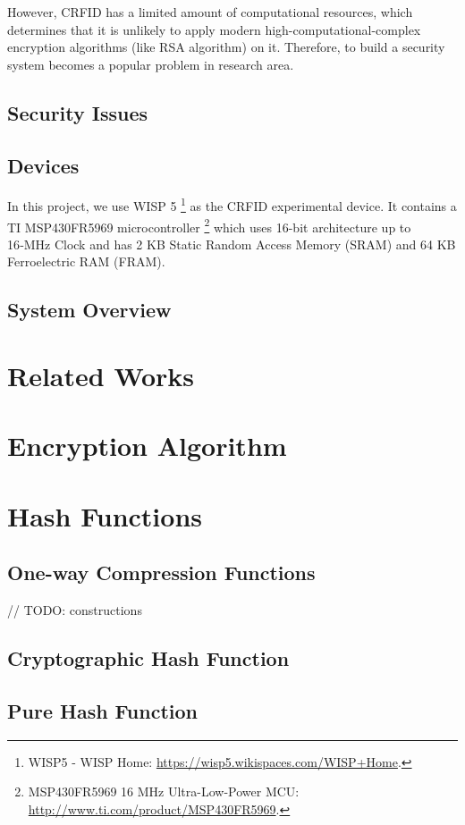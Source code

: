 \documentclass[sigconf, review=false]{acmart}
\begin{document}
However, CRFID has a limited amount of computational resources, which determines that it is unlikely to apply
modern high-computational-complex encryption algorithms (like RSA algorithm) on it.
Therefore, to build a security system becomes a popular problem in research area.

\subsection{Security Issues}


\subsection{Devices}
In this project, we use WISP 5 \footnote{WISP5 - WISP Home: \url{https://wisp5.wikispaces.com/WISP+Home}.} as the CRFID experimental device.
It contains a TI MSP430FR5969 microcontroller \footnote{MSP430\texttrademark FR5969 16 MHz Ultra-Low-Power MCU: \url{http://www.ti.com/product/MSP430FR5969}.}
which uses 16-bit architecture up to 16‑MHz Clock and has 2 KB Static Random Access Memory (SRAM) and 64 KB Ferroelectric RAM (FRAM).


\subsection{System Overview}


\section{Related Works}


\section{Encryption Algorithm}


\section{Hash Functions}
\subsection{One-way Compression Functions}
// TODO: constructions


\subsection{Cryptographic Hash Function}

\subsection{Pure Hash Function}
\end{document}
